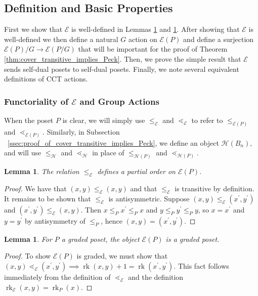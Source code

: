 \documentclass[10 pt]{amsart}
\theoremstyle{plain}
\newtheorem{lem}[thm]{Lemma}
\theoremstyle{definition}
\theoremstyle{remark}
\numberwithin{equation}{section}
\newcommand\ssec{\subsection}
\newcommand\sssec{\subsubsection}
\newcommand\rk{\operatorname{rk}}
\begin{document}
\ssec{Definition and Basic Properties}\label{ssec:definition_and_basic_properties}
First we show that $\mathcal{E}$ is well-defined in Lemmas \ref{lem:f_partial_order} and \ref{lem:FP_graded_poset}.  After showing that $\mathcal E$ is well-defined we then define a natural $G$ action on $\mathcal E(P)$ and define a surjection $\mathcal E(P)/G\rightarrow \mathcal E(P/G)$ that will be important for the proof of Theorem \ref{thm:cover_transitive_implies_Peck}. Then, we prove the simple result that $\mathcal E$ sends self-dual posets to self-dual posets. Finally, we note several equivalent definitions of CCT actions.

\sssec{Functoriality of $\mathcal E$ and Group Actions}

When the poset $P$ is clear, we will simply use $\leq_{\mathcal E}$ and $\lessdot_{\mathcal E}$ to refer to $\leq_{\mathcal E(P)}$ and $\lessdot_{\mathcal E(P)}$. Similarly, in Subsection ~\ref{ssec:proof_of_cover_transitive_implies_Peck}, we define an object $\mathcal H(B_n),$ and will use $\leq_{\mathcal H}$ and $\lessdot_{\mathcal H}$ in place of $\leq_{\mathcal H(P)}$ and $\lessdot_{\mathcal H(P)}$.

\begin{lem}\label{lem:f_partial_order}
The relation $\le_{\mathcal E}$ defines a partial order on $\mathcal E(P)$.
\end{lem}

\begin{proof}
We have that $(x, y)\le_{\mathcal E} (x, y)$ and that $\le_{\mathcal E}$ is transitive by definition.  It remains to be shown that $\le_{\mathcal E}$ is antisymmetric.  Suppose $(x, y)\le_{\mathcal E} (x^\prime, y^\prime)$ and $(x^\prime, y^\prime)\le_{\mathcal E} (x, y)$.  Then $x\le_P x^\prime \le_P x$ and $y\le_P y^\prime \le_P y$, so $x = x^\prime$ and $y=y^\prime$ by antisymmetry of $\le_P$, hence $(x, y) = (x^\prime, y^\prime)$.
\end{proof}

\begin{lem}\label{lem:FP_graded_poset}
For $P$ a graded poset, the object $\mathcal E(P)$ is a graded poset.
\end{lem}

\begin{proof}
To show $\mathcal E(P)$ is graded, we must show that $(x, y) \lessdot_{\mathcal E} (x^\prime, y^\prime) \implies \rk(x, y)+1 = \rk(x^\prime , y^\prime)$.  This fact follows immediately from the definition of $\lessdot_{\mathcal E}$ and the definition $\rk_{\mathcal E}(x, y) = \rk_P(x)$.
\end{proof}
\end{document}
